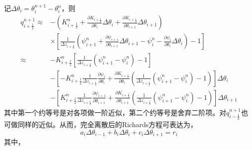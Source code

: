 记$\Delta \theta_i=\theta_i^{n+1}-\theta_i^n$，则
\begin{equation}
\begin{split} 
q_{i+\frac{1}{2}}^{n+1} \approx &-\left(K_{i+\frac{1}{2}}^{n}+\frac{\partial K_{i+\frac{1}{2}}}{\partial \theta_{i}} \Delta \theta_{i} + \frac{\partial K_{i+\frac{1}{2}}}{\partial \theta_{i+1}} \Delta \theta_{i+1}\right)  \\
    & \times \left[\frac{1}{\Delta z_{i+\frac{1}{2}}}\left(\psi_{i+1}^{n}+\frac{\partial \psi_{i+1}}{\partial \theta_{i+1}} \Delta \theta_{i+1}-\psi_{i}^{n}-\frac{\partial \psi_{i}}
    {\partial \theta_{i}} \Delta \theta_{i}\right)-1\right] \\ 
    \approx & -K_{i+\frac{1}{2}}^{n}\left[\frac{1}{\Delta z_{i+\frac{1}{2}}}\left(\psi_{i+1}^{n}-\psi_{i}^{n}\right)-1\right] \\
    &-\left[-K_{i+\frac{1}{2}}^{n} \frac{1}{\Delta z_{i+\frac{1}{2}}} \frac{\partial \psi_{i}}{\partial \theta_{i}}+\frac{\partial K_{i+\frac{1}{2}}}{\partial 
     \theta_{i}}\left(\frac{1}{\Delta z_{i+\frac{1}{2}}}\left(\psi_{i+1}^{n}-\psi_{i}^{n}\right)-1\right)\right] \Delta \theta_{i} \\ 
    &-\left[K_{i+\frac{1}{2}}^{n} \frac{1}{\Delta z_{i+\frac{1}{2}}} \frac{\partial \psi_{i+1}}{\partial \theta_{i+1}}+\frac{\partial K_{i+\frac{1}{2}}}{\partial
      \theta_{i+1}}\left(\frac{1}{\Delta z_{i+\frac{1}{2}}}\left(\psi_{i+1}^{n}-\psi_{i}^{n}\right)-1\right)\right] \Delta \theta_{i+1} 
\end{split}
\end{equation}
其中第一个约等号是对各项做一阶近似，第二个约等号是舍弃二阶项。对$q_{i-\frac{1}{2}}^{n+1}$也可做同样的近似。从而，完全离散后的Richards方程可表达为，
\begin{equation}
a_i \Delta \theta_{i-1}+b_i \Delta \theta_{i}+c_i \Delta \theta_{i+1}=r_i
\end{equation}
其中，
